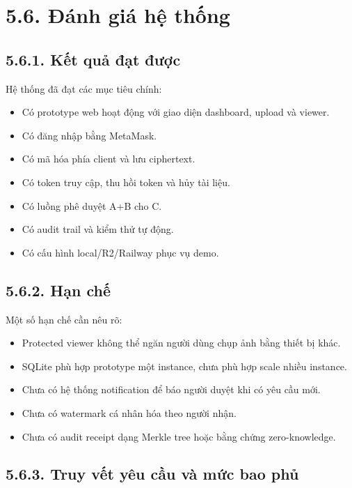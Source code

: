 \section*{5.6. Đánh giá hệ thống}
{}

\subsection*{5.6.1. Kết quả đạt được}
{}

Hệ thống đã đạt các mục tiêu chính:

\begin{itemize}
  \item Có prototype web hoạt động với giao diện dashboard, upload và viewer.
  \item Có đăng nhập bằng MetaMask.
  \item Có mã hóa phía client và lưu ciphertext.
  \item Có token truy cập, thu hồi token và hủy tài liệu.
  \item Có luồng phê duyệt A+B cho C.
  \item Có audit trail và kiểm thử tự động.
  \item Có cấu hình local/R2/Railway phục vụ demo.
\end{itemize}

\subsection*{5.6.2. Hạn chế}
{}

Một số hạn chế cần nêu rõ:

\begin{itemize}
  \item Protected viewer không thể ngăn người dùng chụp ảnh bằng thiết bị khác.
  \item SQLite phù hợp prototype một instance, chưa phù hợp scale nhiều instance.
  \item Chưa có hệ thống notification để báo người duyệt khi có yêu cầu mới.
  \item Chưa có watermark cá nhân hóa theo người nhận.
  \item Chưa có audit receipt dạng Merkle tree hoặc bằng chứng zero-knowledge.
\end{itemize}

\subsection*{5.6.3. Truy vết yêu cầu và mức bao phủ}
{}

